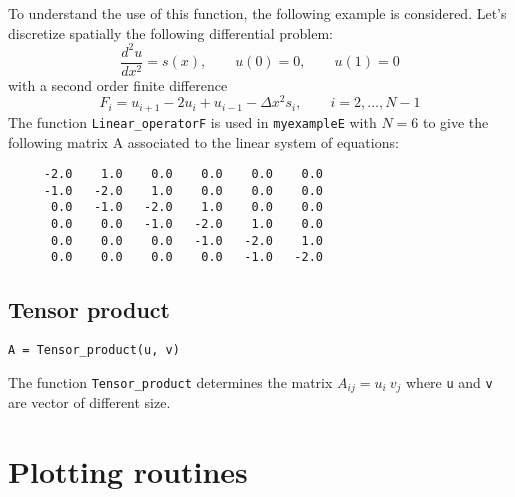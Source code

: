 To understand the use of this function, the following example is considered. 
Let's discretize spatially the following differential problem:  
$$
    \frac{ d^2 u }{ d x^2 } = s(x), \qquad u(0)= 0, \qquad u(1) = 0  
$$
with a second order finite difference
$$
  F_i = u_{i+1} - 2 u_i + u_{i-1} -  \Delta x^2 s_i, \qquad i=2, \ldots, N-1
$$
The  function \verb|Linear_operatorF| is used in  \verb|myexampleE| with $ N = 6 $ 
to give the following matrix A 
associated to the linear system of  equations: 
%
%  
\begin{verbatim}   
     -2.0    1.0    0.0    0.0    0.0    0.0
     -1.0   -2.0    1.0    0.0    0.0    0.0
      0.0   -1.0   -2.0    1.0    0.0    0.0
      0.0    0.0   -1.0   -2.0    1.0    0.0
      0.0    0.0    0.0   -1.0   -2.0    1.0
      0.0    0.0    0.0    0.0   -1.0   -2.0
\end{verbatim} 
       
 
 
 
\subsection*{Tensor product}
\begin{lstlisting}[frame=trBL]
A = Tensor_product(u, v) 
\end{lstlisting}
The function \verb|Tensor_product| determines the matrix   $ A_{ij} = u_i \ v_j   $
where \verb|u| and \verb|v| are vector of different size.    

 
 

\newpage 
\section{Plotting routines}

